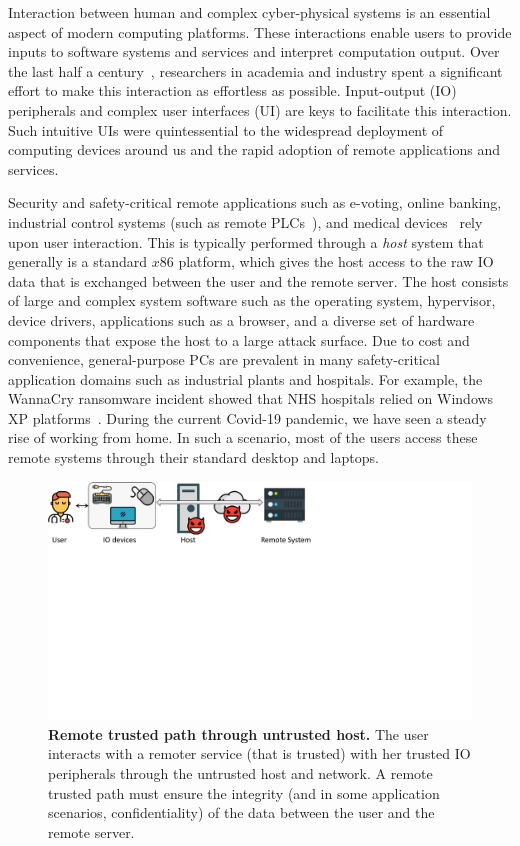 Interaction between human and complex cyber-physical systems is an essential aspect of modern computing platforms. These interactions enable users to provide inputs to software systems and services and interpret computation output. Over the last half a century~\cite{hci_history_1,hci_history_2}, researchers in academia and industry spent a significant effort to make this interaction as effortless as possible. Input-output (IO) peripherals and complex user interfaces (UI) are keys to facilitate this interaction. Such intuitive UIs were quintessential to the widespread deployment of computing devices around us and the rapid adoption of remote applications and services. 

Security and safety-critical remote applications such as e-voting, online banking, industrial control systems (such as remote PLCs~\cite{controlbyweb}), and medical devices~\cite{medicalDevice} rely upon user interaction. This is typically performed through a \emph{host} system that generally is a standard $x86$ platform, which gives the host access to the raw IO data that is exchanged between the user and the remote server. The host consists of large and complex system software such as the operating system, hypervisor, device drivers, applications such as a browser, and a diverse set of hardware components that expose the host to a large attack surface. Due to cost and convenience, general-purpose PCs are prevalent in many safety-critical application domains such as industrial plants and hospitals. For example, the WannaCry ransomware incident showed that NHS hospitals relied on Windows XP platforms~\cite{berry_2017,field_wannacry_2018}. During the current Covid-19 pandemic, we have seen a steady rise of working from home. In such a scenario, most of the users access these remote systems through their standard desktop and laptops.


\begin{figure}[t]
  \centering
    \includegraphics[trim={0 14cm 12cm 0},clip,width=\linewidth]{chapters/introduction/images/trustedPath.pdf}
    \caption[Remote trusted path through untrusted host]{\textbf{Remote trusted path through untrusted host.} The user interacts with a remoter service (that is trusted) with her trusted IO peripherals through the untrusted host and network. A remote trusted path must ensure the integrity (and in some application scenarios, confidentiality) of the data between the user and the remote server.}
    \label{fig:trustedPath}
\end{figure}


